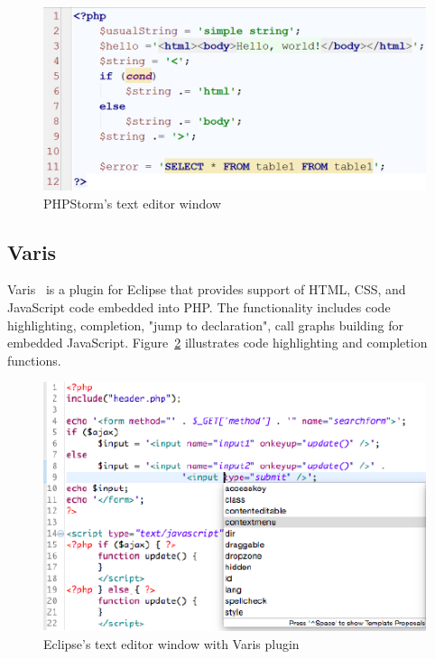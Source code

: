 \documentclass{sig-alternate-05-2015}
\begin{document}
\begin{figure}[h!]
    \begin{center}
        \includegraphics[scale=0.30]{Figures/PHPStorm.png}
    \end{center}
    \caption{PHPStorm's text editor window}
    \label{PHPStorm_pic}
\end{figure} 

\subsection{Varis}

Varis~\cite{Varis:ref} is a plugin for Eclipse that provides support of HTML, CSS, and JavaScript code embedded into PHP. The functionality includes code highlighting, completion, "jump to declaration", call graphs building for embedded JavaScript. Figure~\ref{varis_pic} illustrates code highlighting and completion functions. 

\begin{figure}[h!]
    \begin{center}
        \includegraphics[scale=0.60]{Figures/Varis.PNG}
    \end{center}
    \caption{Eclipse's text editor window with Varis plugin}
    \label{varis_pic}
\end{figure} 
\end{document}
